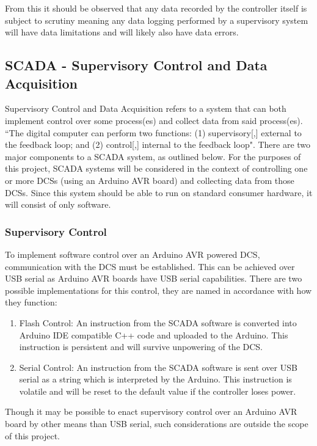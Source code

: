 \documentclass[../main.tex]{subfiles}
\begin{document}
From this it should be observed that any data recorded by the controller itself is subject to scrutiny meaning any data logging performed by a supervisory system will have data limitations and will likely also have data errors.

\subsection{SCADA - Supervisory Control and Data Acquisition}
\label{sec:scada_background}
Supervisory Control and Data Acquisition refers to a system that can both implement control over some process(es) and collect data from said process(es). ``The digital computer can perform two functions: (1) supervisory[,] external to the feedback loop; and (2) control[,] internal to the feedback loop"\cite[p.~578]{controls}. There are two major components to a SCADA system, as outlined below. For the purposes of this project, SCADA systems will be considered in the context of controlling one or more DCSs (using an Arduino AVR board) and collecting data from those DCSs. Since this system should be able to run on standard consumer hardware, it will consist of only software.

\subsubsection{Supervisory Control}
\label{sec:sca}
To implement software control over an Arduino AVR powered DCS, communication with the DCS must be established. This can be achieved over USB serial as Arduino AVR boards have USB serial capabilities\cite{uno}\cite{mega}. There are two possible implementations for this control, they are named in accordance with how they function:
\begin{enumerate}[label=\arabic*.]

\item Flash Control: An instruction from the SCADA software is converted into Arduino IDE compatible C++ code and uploaded to the Arduino. This instruction is persistent and will survive unpowering of the DCS.
\item Serial Control: An instruction from the SCADA software is sent over USB serial as a string which is interpreted by the Arduino. This instruction is volatile and will be reset to the default value if the controller loses power.

\end{enumerate}
Though it may be possible to enact supervisory control over an Arduino AVR board by other means than USB serial, such considerations are outside the scope of this project.
\end{document}
